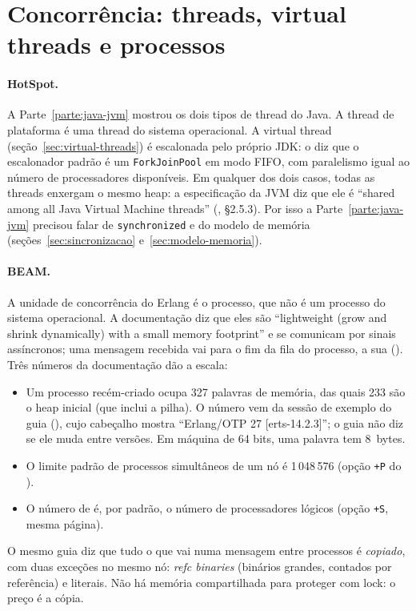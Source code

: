 \section{Concorrência: threads, virtual threads e processos}
\label{sec:vms-concorrencia}

\paragraph{HotSpot.}
A Parte~\ref{parte:java-jvm} mostrou os dois tipos de thread do Java. A thread de plataforma
é uma thread do sistema operacional. A virtual thread
(seção~\ref{sec:virtual-threads}) é escalonada pelo próprio JDK: o
 diz que o escalonador padrão é um
\texttt{ForkJoinPool} em modo FIFO, com paralelismo igual ao número de
processadores disponíveis. Em qualquer dos dois casos, todas as threads
enxergam o mesmo heap: a especificação da JVM diz que ele é
\enquote{shared among all Java Virtual Machine threads}
(, §2.5.3). Por isso a Parte~\ref{parte:java-jvm} precisou falar de
\texttt{synchronized} e do modelo de memória
(seções~\ref{sec:sincronizacao} e~\ref{sec:modelo-memoria}).

\paragraph{BEAM.}
A unidade de concorrência do Erlang é o processo, que não é um processo
do sistema operacional. A documentação diz que eles são
\enquote{lightweight (grow and shrink dynamically) with a small memory
footprint} e se comunicam por sinais assíncronos; uma mensagem recebida
vai para o fim da fila do processo, a sua
 ().
Três números da documentação dão a escala:
\begin{itemize}
\item Um processo recém-criado ocupa 327 palavras de memória, das quais
  233 são o heap inicial (que inclui a pilha). O número vem da sessão de
  exemplo do guia (), cujo cabeçalho
  mostra \enquote{Erlang/OTP 27 [erts-14.2.3]}; o guia não diz se ele muda
  entre versões. Em máquina de 64 bits,
  uma palavra tem 8~bytes.
\item O limite padrão de processos simultâneos de um nó é 1\,048\,576
  (opção \texttt{+P} do ).
\item O número de 
  é, por padrão, o número de processadores lógicos (opção \texttt{+S},
  mesma página).
\end{itemize}
O mesmo guia diz que tudo o que vai numa mensagem entre processos é
\emph{copiado}, com duas exceções no mesmo nó: \emph{refc binaries}
(binários grandes, contados por referência) e literais. Não há memória
compartilhada para proteger com lock: o preço é a cópia.


